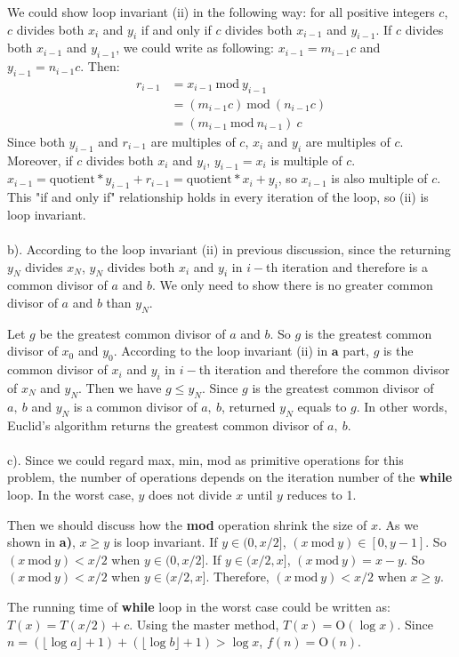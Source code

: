 \documentclass[twoside,11pt]{homework}
\begin{document}
We could show loop invariant (ii) in the following way: for all positive integers $c$, $c$ divides both $x_i$ and $y_i$ if and only if $c$ divides both $x_{i-1}$ and $y_{i-1}$.
If  $c$ divides both $x_{i-1}$ and $y_{i-1}$, we could write as following: $x_{i-1} = m_{i-1} c$ and $y_{i-1} = n_{i-1} c$. Then:
%
\begin{equation}
\begin{split}
r_{i-1} &= x_{i-1} \ \mathrm{mod}\ y_{i-1} \\
     &=  (m_{i-1} c)  \ \mathrm{mod}\ (n_{i-1} c) \\
     &= (m_{i-1} \ \mathrm{mod}\ n_{i-1})\ c    
\end{split}
\end{equation}
Since both $y_{i-1}$ and $r_{i-1}$ are multiples of $c$, $x_i$ and $y_i$ are multiples of $c$.
Moreover, if $c$ divides both $x_i$ and $y_i$, $y_{i-1} = x_i$ is multiple of $c$. 
$x_{i-1} = \mathrm{quotient} * y_{i-1} + r_{i-1} =  \mathrm{quotient} * x_i + y_i$, so $x_{i-1}$ is also multiple of $c$.
This "if and only if" relationship holds in every iteration of the loop, so (ii) is loop invariant.
\\\\

\noindent b).
According to the loop invariant (ii) in previous discussion, since the returning $y_N$ divides $x_N$, $y_N$ divides both $x_i$ and $y_i$ in $i-$th iteration and therefore is a common divisor of $a$ and $b$. 
We only need to show there is no greater common divisor of $a$ and $b$ than $y_N$.

Let $g$ be the greatest common divisor of $a$ and $b$. So $g$ is the greatest common divisor of $x_0$ and $y_0$. According to the loop invariant (ii) in $\textbf{a}$ part, $g$ is the common divisor of $x_i$ and $y_i$ in $i-$th iteration and therefore the common divisor of $x_N$ and $y_N$. 
Then we have $g \le y_N$.
Since $g$ is the greatest common divisor of $a,\ b$ and $y_N$ is a common divisor of $a,\ b$, returned  $y_N$ equals to $g$.
In other words, Euclid’s algorithm returns the greatest common divisor of $a,\ b$.
\\\\

\noindent c).
Since we could regard max, min, mod as primitive operations for this problem, the number of operations depends on the iteration number of the \textbf{while} loop. 
In the worst case, $y$ does not divide $x$ until $y$ reduces to 1. 

Then we should discuss how the \textbf{mod} operation shrink the size of $x$.
As we shown in \textbf{a)}, $x \ge y$ is loop invariant. 
If $y \in (0, x/2]$, $(x\ \mathrm{mod}\ y) \in [0, y-1]$.
So $(x\ \mathrm{mod}\ y) < x/2$ when $y \in (0, x/2]$.
If $y \in (x/2, x]$, $(x\ \mathrm{mod}\ y) = x-y$.
So $(x\ \mathrm{mod}\ y) < x/2$ when $y \in (x/2, x]$.
Therefore, $(x\ \mathrm{mod}\ y) < x/2$ when $x \ge y$.

The running time of \textbf{while} loop in the worst case could be written as: $T(x) = T(x/2) + c$.
Using the master method, $T(x) = \mathrm{O} (\log x)$.
Since $n = (\lfloor \log a \rfloor + 1) + (\lfloor \log b \rfloor +1) > \log x$, $f(n) = \mathrm{O}(n)$.
\end{document}
